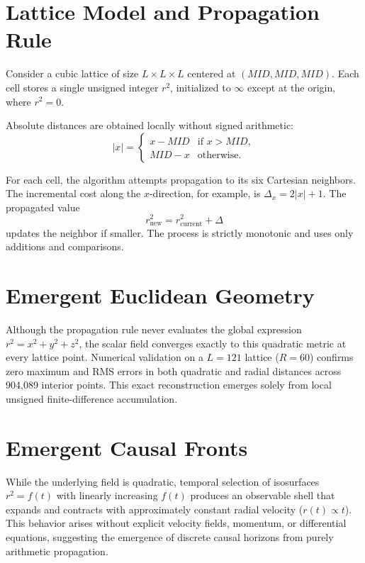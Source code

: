 \documentclass[11pt,a4paper]{article}
\begin{document}
\section{Lattice Model and Propagation Rule}

Consider a cubic lattice of size \(L \times L \times L\) centered at \((MID, MID, MID)\). Each cell stores a single unsigned integer \(r^2\), initialized to \(\infty\) except at the origin, where \(r^2 = 0\).

Absolute distances are obtained locally without signed arithmetic:
\[
|x| = 
\begin{cases}
x - MID & \text{if } x > MID, \\
MID - x & \text{otherwise}.
\end{cases}
\]

For each cell, the algorithm attempts propagation to its six Cartesian neighbors. The incremental cost along the \(x\)-direction, for example, is \(\Delta_x = 2|x| + 1\). The propagated value
\[
r^2_{\text{new}} = r^2_{\text{current}} + \Delta
\]
updates the neighbor if smaller. The process is strictly monotonic and uses only additions and comparisons.

\section{Emergent Euclidean Geometry}

Although the propagation rule never evaluates the global expression \(r^2 = x^2 + y^2 + z^2\), the scalar field converges exactly to this quadratic metric at every lattice point. Numerical validation on a \(L=121\) lattice (\(R=60\)) confirms zero maximum and RMS errors in both quadratic and radial distances across 904,089 interior points. This exact reconstruction emerges solely from local unsigned finite-difference accumulation.

\section{Emergent Causal Fronts}

While the underlying field is quadratic, temporal selection of isosurfaces \(r^2 = f(t)\) with linearly increasing \(f(t)\) produces an observable shell that expands and contracts with approximately constant radial velocity (\(r(t) \propto t\)). This behavior arises without explicit velocity fields, momentum, or differential equations, suggesting the emergence of discrete causal horizons from purely arithmetic propagation.
\end{document}
